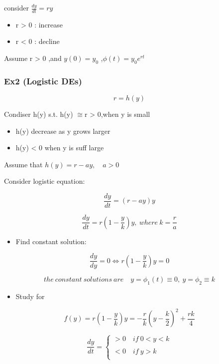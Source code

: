 \documentclass[12pt, a4paper]{article}
\theoremstyle{break}
\providecommand{\tightlist}{\setlength{\itemsep}{0pt}\setlength{\parskip}{0pt}}
\begin{document}
consider \(\frac{dy}{dt} = ry\)

\begin{itemize}
\tightlist
\item
  r \textgreater{} 0 : increase
\item
  r \textless{} 0 : decline
\end{itemize}

Assume r \textgreater{} 0 ,and \(y(0) = y_0\) ,\(\phi(t) = y_0 e^{rt}\)

\subsubsection{Ex2 (Logistic DEs)}\label{ex2-logistic-des}

\[
r = h(y)
\]

Condiser h(y) s.t. h(y) \(\cong\)r \textgreater{} 0,when y is small

\begin{itemize}
\tightlist
\item
  h(y) decrease as y grows larger
\item
  h(y) \textless{} 0 when y is suff large
\end{itemize}

Assume that \(h(y) = r-ay ,\quad a > 0\)

Consider logistic equation:

\[
\frac{dy}{dt} = (r-ay)y
\]

\[
\frac{dy}{dt} = r(1- \frac{y}{k})y , \ where \ k =\frac{r}{a} 
\]

\begin{itemize}
\tightlist
\item
  Find constant solution:
\end{itemize}

\[
\frac{dy}{dy} = 0 \Longleftrightarrow r(1-\frac{y}{k})y = 0
\]

\[
the\ constant \ solutions \ are \quad y = \phi_1(t) \equiv0 ,\ y = \phi_2 \equiv k
\]

\begin{itemize}
\tightlist
\item
  Study for
\end{itemize}

\[
f( y) = r(1-\frac{y}{k})y = -\frac{r}{k}(y - \frac{k}{2})^2 + \frac{rk}{4}
\]

\[
\frac{dy}{dt} = \begin{cases} > 0 \quad if \ 0 < y < k \\ \quad \\ <0 \quad if \ y > k \\ \end{cases}
\]
\end{document}
